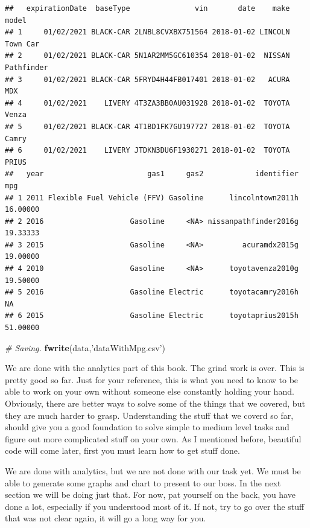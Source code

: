\documentclass[]{book}
\newenvironment{Shaded}{\begin{snugshade}}{\end{snugshade}}
\newcommand{\CommentTok}[1]{\textcolor[rgb]{0.56,0.35,0.01}{\textit{#1}}}
\newcommand{\KeywordTok}[1]{\textcolor[rgb]{0.13,0.29,0.53}{\textbf{#1}}}
\newcommand{\NormalTok}[1]{#1}
\newcommand{\StringTok}[1]{\textcolor[rgb]{0.31,0.60,0.02}{#1}}
\begin{document}
\begin{verbatim}
##   expirationDate  baseType               vin       date    make      model
## 1     01/02/2021 BLACK-CAR 2LNBL8CVXBX751564 2018-01-02 LINCOLN   Town Car
## 2     01/02/2021 BLACK-CAR 5N1AR2MM5GC610354 2018-01-02  NISSAN Pathfinder
## 3     01/02/2021 BLACK-CAR 5FRYD4H44FB017401 2018-01-02   ACURA        MDX
## 4     01/02/2021    LIVERY 4T3ZA3BB0AU031928 2018-01-02  TOYOTA      Venza
## 5     01/02/2021 BLACK-CAR 4T1BD1FK7GU197727 2018-01-02  TOYOTA      Camry
## 6     01/02/2021    LIVERY JTDKN3DU6F1930271 2018-01-02  TOYOTA      PRIUS
##   year                        gas1     gas2            identifier      mpg
## 1 2011 Flexible Fuel Vehicle (FFV) Gasoline      lincolntown2011h 16.00000
## 2 2016                    Gasoline     <NA> nissanpathfinder2016g 19.33333
## 3 2015                    Gasoline     <NA>         acuramdx2015g 19.00000
## 4 2010                    Gasoline     <NA>      toyotavenza2010g 19.50000
## 5 2016                    Gasoline Electric      toyotacamry2016h       NA
## 6 2015                    Gasoline Electric      toyotaprius2015h 51.00000
\end{verbatim}

\begin{Shaded}
\begin{Highlighting}[]
\CommentTok{# Saving.}
\KeywordTok{fwrite}\NormalTok{(data,}\StringTok{'dataWithMpg.csv'}\NormalTok{)}
\end{Highlighting}
\end{Shaded}

We are done with the analytics part of this book. The grind work is over. This is pretty good so far. Just for your reference, this is what you need to know to be able to work on your own without someone else constantly holding your hand. Obviously, there are better ways to solve some of the things that we covered, but they are much harder to grasp. Understanding the stuff that we coverd so far, should give you a good foundation to solve simple to medium level tasks and figure out more complicated stuff on your own. As I mentioned before, beautiful code will come later, first you must learn how to get stuff done.

We are done with analytics, but we are not done with our task yet. We must be able to generate some graphs and chart to present to our boss. In the next section we will be doing just that. For now, pat yourself on the back, you have done a lot, especially if you understood most of it. If not, try to go over the stuff that was not clear again, it will go a long way for you.
\end{document}
